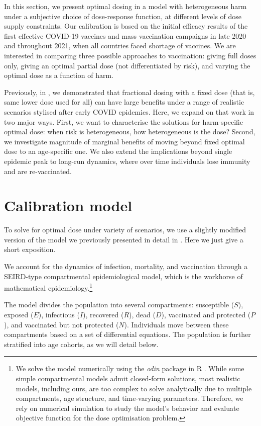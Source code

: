 \documentclass[12pt]{article}
\begin{document}
In this section, we present optimal dosing in a model with heterogeneous harm under a subjective choice of dose-response function, at different levels of dose supply constraints. Our calibration is based on the initial efficacy results of the first effective COVID-19 vaccines and mass vaccination campaigns in late 2020 and throughout 2021, when all countries faced shortage of vaccines. We are interested in comparing three possible approaches to vaccination: giving full doses only, giving an optimal partial dose (not differentiated by risk), and varying the optimal dose as a function of harm.

Previously, in \cite{wiecek2021}, we demonstrated that fractional dosing with a fixed dose (that is, same lower dose used for all) can have large benefits under a range of realistic scenarios stylised after early COVID epidemics. Here, we expand on that work in two major ways. First, we want to characterise the solutions for harm-specific optimal dose: when risk is heterogeneous, how heterogeneous is the dose? Second, we investigate magnitude of marginal benefits of moving beyond fixed optimal dose to an age-specific one. We also extend the implications beyond single epidemic peak to long-run dynamics, where over time individuals lose immunity and are re-vaccinated.


\section{Calibration model}

To solve for optimal dose under variety of scenarios, we use a slightly modified version of the model we previously presented in detail in \cite{wiecek_2021}. Here we just give a short exposition. 

We account for the dynamics of infection, mortality, and vaccination through a SEIRD-type compartmental epidemiological model, which is the workhorse of mathematical epidemiology.\footnote{We solve the model numerically using the \textit{odin} package in R \cite{odin}. While some simple compartmental models admit closed-form solutions, most realistic models, including ours, are too complex to solve analytically due to multiple compartments, age structure, and time-varying parameters. Therefore, we rely on numerical simulation to study the model's behavior and evaluate objective function for the dose optimisation problem.} 

The model divides the population into several compartments: susceptible ($S$), exposed ($E$), infectious ($I$), recovered ($R$), dead ($D$), vaccinated and protected ($P$), and vaccinated but not protected ($N$). Individuals move between these compartments based on a set of differential equations. The population is further stratified into age cohorts, as we will detail below.
\end{document}
